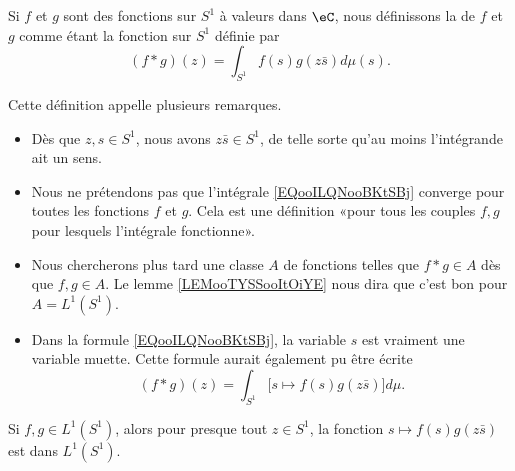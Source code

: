 \begin{definition}
    Si \( f\) et \( g\) sont des fonctions sur \( S^1\) à valeurs dans \( \eC\), nous définissons la  de \( f\) et \( g\) comme étant la fonction sur \( S^1\) définie par
    \begin{equation}        \label{EQooILQNooBKtSBj}
        (f*g)(z)=\int_{S^1}f(s)g(z\bar s)d\mu(s).
    \end{equation}
\end{definition}

Cette définition appelle plusieurs remarques.
\begin{itemize}
    \item
        Dès que \( z,s\in S^1\), nous avons \( z\bar s\in S^1\), de telle sorte qu'au moins l'intégrande ait un sens.
    \item Nous ne prétendons pas que l'intégrale \eqref{EQooILQNooBKtSBj} converge pour toutes les fonctions \( f\) et \( g\). Cela est une définition «pour tous les couples \( f,g\) pour lesquels l'intégrale fonctionne».
    \item
        Nous chercherons plus tard une classe \( A\) de fonctions telles que \( f*g\in A\) dès que \( f,g\in A\). Le lemme \ref{LEMooTYSSooItOiYE} nous dira que c'est bon pour \( A=L^1(S^1)\).
    \item
        Dans la formule \eqref{EQooILQNooBKtSBj}, la variable \( s\) est vraiment une variable muette. Cette formule aurait également pu être écrite
    \begin{equation}        
        (f*g)(z)=\int_{S^1} \big[ s\mapsto f(s)g(z\bar s) \big]d\mu.
    \end{equation}
\end{itemize}

\begin{lemma}        \label{LEMooTYSSooItOiYE}
    Si \( f,g\in L^1(S^1)\), alors pour presque tout \( z\in S^1\), la fonction \( s\mapsto f(s)g(z\bar s)\) est dans \( L^1(S^1)\).
\end{lemma}

